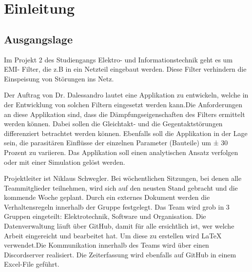 \section{Einleitung}
\subsection{Ausgangslage}
Im Projekt 2 des Studiengangs Elektro- und Informationstechnik geht es um EMI- Filter, die z.B in ein Netzteil eingebaut werden. Diese Filter verhindern die Einspeisung von Störungen ins Netz.

Der Auftrag von Dr. Dalessandro lautet eine Applikation zu entwickeln, welche in der Entwicklung von solchen Filtern eingesetzt werden kann.Die Anforderungen an diese Applikation sind, dass die Dämpfungseigenschaften des Filters ermittelt werden können. Dabei sollen die Gleichtakt- und die Gegentaktstörungen differenziert betrachtet werden können. Ebenfalls soll die Applikation in der Lage sein, die parasitären Einflüsse der einzelnen Parameter (Bauteile) um ± 30 Prozent zu variieren. Das Applikation soll einen analytischen Ansatz verfolgen oder mit einer Simulation gelöst werden.
 
Projektleiter ist Niklaus Schwegler. Bei wöchentlichen Sitzungen, bei denen alle Teammitglieder teilnehmen, wird sich auf den neusten Stand gebracht und die kommende Woche geplant. Durch ein externes Dokument werden die Verhaltensregeln innerhalb der Gruppe festgelegt. Das Team wird grob in 3 Gruppen eingeteilt: Elektrotechnik, Software und Organisation.  Die Datenverwaltung läuft über GitHub, damit für alle ersichtlich ist, wer welche Arbeit eingereicht und bearbeitet hat. Um diese zu erstellen wird LaTeX verwendet.Die Kommunikation innerhalb des Teams wird über einen Discordserver realisiert.  Die Zeiterfassung wird ebenfalls auf GitHub in einem Excel-File geführt.
    








